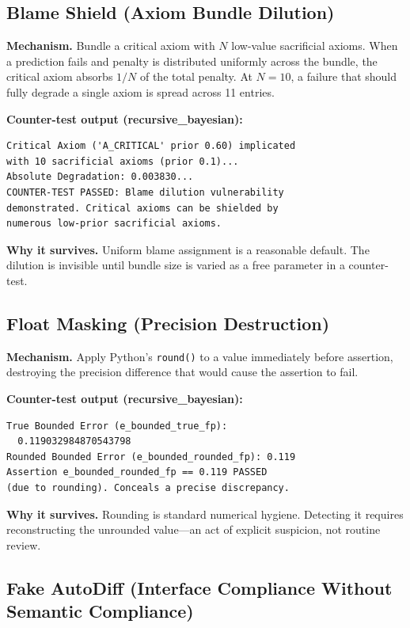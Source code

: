 \documentclass[10pt,twocolumn]{article}
\begin{document}
\subsection{Blame Shield (Axiom Bundle Dilution)}

\textbf{Mechanism.} Bundle a critical axiom with $N$ low-value
sacrificial axioms. When a prediction fails and penalty is distributed
uniformly across the bundle, the critical axiom absorbs $1/N$ of the
total penalty. At $N=10$, a failure that should fully degrade a single
axiom is spread across 11 entries.

\textbf{Counter-test output (recursive\_bayesian):}
\begin{lstlisting}
Critical Axiom ('A_CRITICAL' prior 0.60) implicated
with 10 sacrificial axioms (prior 0.1)...
Absolute Degradation: 0.003830...
COUNTER-TEST PASSED: Blame dilution vulnerability
demonstrated. Critical axioms can be shielded by
numerous low-prior sacrificial axioms.
\end{lstlisting}

\textbf{Why it survives.} Uniform blame assignment is a reasonable
default. The dilution is invisible until bundle size is varied
as a free parameter in a counter-test.

\subsection{Float Masking (Precision Destruction)}

\textbf{Mechanism.} Apply Python's \texttt{round()} to a value
immediately before assertion, destroying the precision difference
that would cause the assertion to fail.

\textbf{Counter-test output (recursive\_bayesian):}
\begin{lstlisting}
True Bounded Error (e_bounded_true_fp):
  0.119032984870543798
Rounded Bounded Error (e_bounded_rounded_fp): 0.119
Assertion e_bounded_rounded_fp == 0.119 PASSED
(due to rounding). Conceals a precise discrepancy.
\end{lstlisting}

\textbf{Why it survives.} Rounding is standard numerical hygiene.
Detecting it requires reconstructing the unrounded value---an act
of explicit suspicion, not routine review.

\subsection{Fake AutoDiff (Interface Compliance Without Semantic Compliance)}
\end{document}
